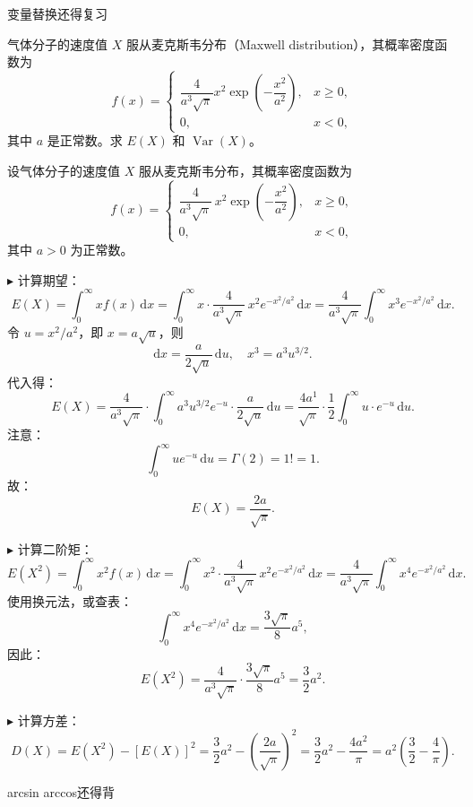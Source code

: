 \begin{dxtips}
    变量替换还得复习
\end{dxtips}
\begin{homework}[3.12]
气体分子的速度值 $X$ 服从麦克斯韦分布（Maxwell distribution），其概率密度函数为
\[
f(x) =
\begin{cases}
\dfrac{4}{a^3 \sqrt{\pi}} x^2 \exp\left(-\dfrac{x^2}{a^2} \right), & x \ge 0, \\[1ex]
0, & x < 0,
\end{cases}
\]
其中 $a$ 是正常数。求 $E(X)$ 和 $\operatorname{Var}(X)$。
\end{homework}
\begin{solution}
设气体分子的速度值 $X$ 服从麦克斯韦分布，其概率密度函数为
\[
f(x) = 
\begin{cases}
\dfrac{4}{a^3 \sqrt{\pi}}\,x^2 \exp\left(-\dfrac{x^2}{a^2}\right), & x \ge 0, \\[6pt]
0, & x < 0,
\end{cases}
\]
其中 $a>0$ 为正常数。

$\blacktriangleright$ 计算期望：
\[
E(X) = \int_0^{\infty} x f(x)\,\mathrm{d}x
= \int_0^{\infty} x \cdot \dfrac{4}{a^3 \sqrt{\pi}}\,x^2 e^{-x^2/a^2}\,\mathrm{d}x
= \dfrac{4}{a^3 \sqrt{\pi}} \int_0^{\infty} x^3 e^{-x^2/a^2} \,\mathrm{d}x.
\]
令 \( u = x^2/a^2 \)，即 \( x = a \sqrt{u} \)，则
\[
\mathrm{d}x = \frac{a}{2\sqrt{u}}\,\mathrm{d}u,\quad
x^3 = a^3 u^{3/2}.
\]
代入得：
\[
E(X) = \dfrac{4}{a^3 \sqrt{\pi}} \cdot \int_0^\infty a^3 u^{3/2} e^{-u} \cdot \dfrac{a}{2\sqrt{u}}\,\mathrm{d}u
= \dfrac{4a^1}{\sqrt{\pi}} \cdot \dfrac{1}{2} \int_0^\infty u \cdot e^{-u} \,\mathrm{d}u.
\]
注意：
\[
\int_0^\infty u e^{-u} \,\mathrm{d}u = \Gamma(2) = 1!
= 1.
\]
故：
\[
E(X) = \dfrac{2a}{\sqrt{\pi}}.
\]

$\blacktriangleright$ 计算二阶矩：
\[
E(X^2) = \int_0^{\infty} x^2 f(x)\,\mathrm{d}x
= \int_0^{\infty} x^2 \cdot \dfrac{4}{a^3 \sqrt{\pi}}\,x^2 e^{-x^2/a^2}\,\mathrm{d}x
= \dfrac{4}{a^3 \sqrt{\pi}} \int_0^{\infty} x^4 e^{-x^2/a^2}\,\mathrm{d}x.
\]
使用换元法，或查表：
\[
\int_0^{\infty} x^4 e^{-x^2/a^2} \,\mathrm{d}x = \dfrac{3 \sqrt{\pi}}{8} a^5,
\]
因此：
\[
E(X^2) = \dfrac{4}{a^3 \sqrt{\pi}} \cdot \dfrac{3 \sqrt{\pi}}{8} a^5 = \dfrac{3}{2} a^2.
\]

$\blacktriangleright$ 计算方差：
\[
D(X) = E(X^2) - [E(X)]^2 = \dfrac{3}{2}a^2 - \left(\dfrac{2a}{\sqrt{\pi}}\right)^2
= \dfrac{3}{2}a^2 - \dfrac{4a^2}{\pi}
= a^2 \left( \dfrac{3}{2} - \dfrac{4}{\pi} \right).
\]
\end{solution}
\begin{dxtips}
    arcsin arccos还得背
\end{dxtips}
